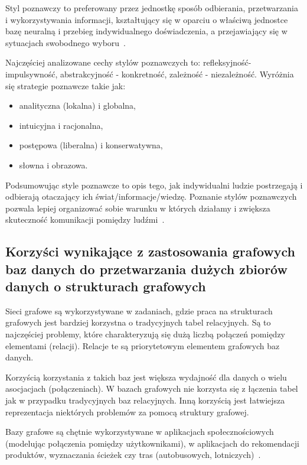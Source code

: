 \documentclass[wi]{zut}
\begin{document}
Styl poznawczy to preferowany przez jednostkę sposób odbierania, przetwarzania i wykorzystywania informacji, kształtujący się w oparciu o właściwą jednostce bazę neuralną i przebieg indywidualnego doświadczenia, a przejawiający się w sytuacjach swobodnego wyboru~\cite{bator1991wyznaczniki}.

Najczęściej analizowane cechy stylów poznawczych to: refleksyjność-impulsywność, abstrakcyjność - konkretność, zależność - niezależność. Wyróżnia się strategie poznawcze takie jak:

\begin{itemize}
    \item analityczna (lokalna) i globalna,
    \item intuicyjna i racjonalna,
    \item postępowa (liberalna) i konserwatywna,
    \item słowna i obrazowa.
\end{itemize}

Podsumowując style poznawcze to opis tego, jak indywidualni ludzie postrzegają i odbierają otaczający ich świat/informacje/wiedzę. Poznanie stylów poznawczych pozwala lepiej organizować sobie warunku w których działamy i zwiększa skuteczność komunikacji pomiędzy ludźmi~\cite{perso_style}.


\subsection{Korzyści wynikające z zastosowania grafowych baz danych do przetwarzania dużych zbiorów danych o strukturach grafowych}

Sieci grafowe są wykorzystywane w zadaniach, gdzie praca na strukturach grafowych jest bardziej korzystna o tradycyjnych tabel relacyjnych. Są to najczęściej problemy, które charakteryzują się dużą liczbą połączeń pomiędzy elementami (relacji). Relacje te są priorytetowym elementem grafowych baz danych.

Korzyścią korzystania z takich baz jest większa wydajność dla danych o wielu asocjacjach (połączeniach). W bazach grafowych nie korzysta się z łączenia tabel jak w przypadku tradycyjnych baz relacyjnych. Inną korzyścią jest łatwiejsza reprezentacja niektórych problemów za pomocą struktury grafowej.

Bazy grafowe są chętnie wykorzystywane w aplikacjach społecznościowych (modelując połączenia pomiędzy użytkownikami), w aplikacjach do rekomendacji produktów, wyznaczania ścieżek czy tras (autobusowych, lotniczych)~\cite{grafowe}. 
\end{document}

